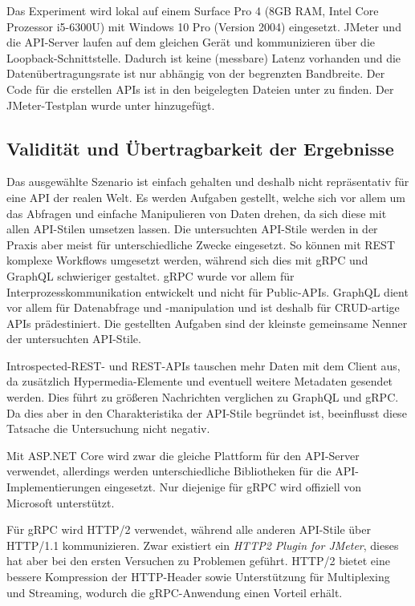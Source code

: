 \para{}Das Experiment wird lokal auf einem Surface Pro 4 (8GB RAM, Intel\textsuperscript{\textregistered{}} Core\texttrademark{} Prozessor i5-6300U) mit Windows 10 Pro (Version 2004) eingesetzt. JMeter und die API-Server laufen auf dem gleichen Gerät und kommunizieren über die Loopback-Schnittstelle. Dadurch ist keine (messbare) Latenz vorhanden und die Datenübertragungsrate ist nur abhängig von der begrenzten Bandbreite. Der Code für die erstellen APIs ist in den beigelegten Dateien unter  zu finden. Der JMeter-Testplan wurde unter  hinzugefügt.

\subsection{Validität und Übertragbarkeit der Ergebnisse}
Das ausgewählte Szenario ist einfach gehalten und deshalb nicht repräsentativ für eine API der realen Welt. Es werden Aufgaben gestellt, welche sich vor allem um das Abfragen und einfache Manipulieren von Daten drehen, da sich diese mit allen API-Stilen umsetzen lassen. Die untersuchten API-Stile werden in der Praxis aber meist für unterschiedliche Zwecke eingesetzt. So können mit REST komplexe Workflows umgesetzt werden, während sich dies mit gRPC und GraphQL schwieriger gestaltet. gRPC wurde vor allem für Interprozesskommunikation entwickelt und nicht für Public-APIs. GraphQL dient vor allem für Datenabfrage und -manipulation und ist deshalb für CRUD-artige APIs prädestiniert. Die gestellten Aufgaben sind der kleinste gemeinsame Nenner der untersuchten API-Stile.

Introspected-REST- und REST-APIs tauschen mehr Daten mit dem Client aus, da zusätzlich Hypermedia-Elemente und eventuell weitere Metadaten gesendet werden. Dies führt zu größeren Nachrichten verglichen zu GraphQL und gRPC. Da dies aber in den Charakteristika der API-Stile begründet ist, beeinflusst diese Tatsache die Untersuchung nicht negativ.

Mit ASP.NET Core wird zwar die gleiche Plattform für den API-Server verwendet, allerdings werden unterschiedliche Bibliotheken für die API-Implementierungen eingesetzt. Nur diejenige für gRPC wird offiziell von Microsoft unterstützt.

Für gRPC wird HTTP/2 verwendet, während alle anderen API-Stile über HTTP/1.1 kommunizieren. Zwar existiert ein \textit{HTTP2 Plugin for JMeter}\footnotemark{}, dieses hat aber bei den ersten Versuchen zu Problemen geführt. HTTP/2 bietet eine bessere Kompression der HTTP-Header sowie Unterstützung für Multiplexing und Streaming, wodurch die gRPC-Anwendung einen Vorteil erhält.

